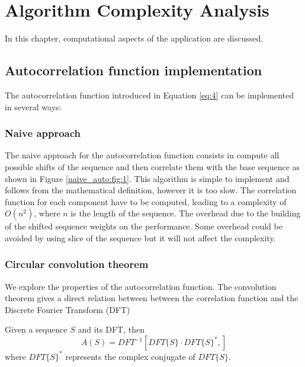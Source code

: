 \chapter{ Algorithm Complexity Analysis}

In this chapter,  computational aspects of the application are discussed.


  \section{ Autocorrelation function implementation}
    The autocorrelation function introduced in Equation \eqref{eq:4} can be
    implemented in several ways:

      \subsection{Naive approach}
        The naive approach for the autocorrelation function consists in
        compute all possible shifts of the sequence and then
         correlate them with the base sequence as shown in Figure
        \ref{naive_auto:fig:1}.  This algorithm is simple to implement and
        follows from the mathematical definition, however it  is too slow. The correlation function
        for each component have to be computed, leading to a
        complexity of $O(n^{2})$, where $n$ is the length of the sequence. The overhead
        due to the building of  the shifted sequence weights on the performance. Some overhead could be avoided by using slice of the sequence but it will not affect the complexity.\\

      \subsection{Circular convolution theorem}
      We explore the properties of the autocorrelation function. The convolution theorem\cite{golomb_ref} gives a  direct relation between between the correlation function and the Discrete Fourier Transform (DFT)\\
      \begin{theorem}
          Given a sequence $S$ and its DFT, then
          \begin{equation}
            A(S) = DFT^{-1}[DFT\{S\} · DFT\{S\}^{*},]
          \end{equation}
          where $DFT\{S\}^{*}$ represents the complex conjugate of $DFT\{S\}$.
        \end{theorem}

